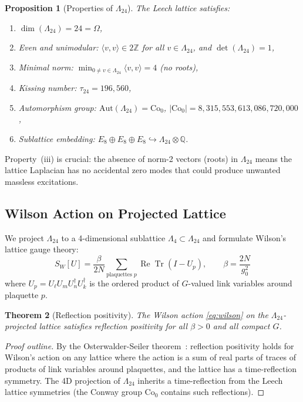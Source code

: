 \documentclass[11pt,a4paper]{article}
\theoremstyle{plain}
\newtheorem{theorem}{Theorem}[section]
\newtheorem{proposition}[theorem]{Proposition}
\theoremstyle{remark}
\renewcommand{\Omega}{\varOmega}
\newcommand{\Z}{\mathbb{Z}}
\newcommand{\Q}{\mathbb{Q}}
\newcommand{\abs}[1]{\lvert #1 \rvert}
\newcommand{\Tr}{\operatorname{Tr}}
\begin{document}
\begin{proposition}[Properties of $\Lambda_{24}$]
\label{prop:leech}
The Leech lattice satisfies:
\begin{enumerate}[label=(\roman*)]
\item $\dim(\Lambda_{24}) = 24 = \Omega$,
\item Even and unimodular: $\langle v, v \rangle \in 2\Z$ for all
  $v \in \Lambda_{24}$, and $\det(\Lambda_{24}) = 1$,
\item Minimal norm: $\min_{0 \neq v \in \Lambda_{24}} \langle v, v \rangle = 4$
  (no roots),
\item Kissing number: $\tau_{24} = 196{,}560$,
\item Automorphism group: $\mathrm{Aut}(\Lambda_{24}) = \mathrm{Co}_0$,
  $\abs{\mathrm{Co}_0} = 8{,}315{,}553{,}613{,}086{,}720{,}000$,
\item Sublattice embedding: $E_8 \oplus E_8 \oplus E_8 \hookrightarrow
  \Lambda_{24} \otimes \Q$.
\end{enumerate}
\end{proposition}

Property~(iii) is crucial: the absence of norm-2 vectors (roots) in
$\Lambda_{24}$ means the lattice Laplacian has no accidental zero modes
that could produce unwanted massless excitations.

\subsection{Wilson Action on Projected Lattice}

We project $\Lambda_{24}$ to a 4-dimensional sublattice
$\Lambda_4 \subset \Lambda_{24}$ and formulate Wilson's lattice gauge
theory:
\begin{equation}\label{eq:wilson}
  S_W[U] = \frac{\beta}{2N} \sum_{\text{plaquettes } p}
  \operatorname{Re}\Tr(I - U_p), \qquad \beta = \frac{2N}{g_0^2}
\end{equation}
where $U_p = U_\ell U_m U_n^\dagger U_k^\dagger$ is the ordered product
of $G$-valued link variables around plaquette $p$.

\begin{theorem}[Reflection positivity]
\label{thm:RP}
The Wilson action \eqref{eq:wilson} on the $\Lambda_{24}$-projected lattice
satisfies reflection positivity for all $\beta > 0$ and all compact $G$.
\end{theorem}

\begin{proof}[Proof outline]
By the Osterwalder-Seiler theorem~\cite{osterwalder-seiler1978}: reflection
positivity holds for Wilson's action on any lattice where the action is a
sum of real parts of traces of products of link variables around plaquettes,
and the lattice has a time-reflection symmetry. The 4D projection of
$\Lambda_{24}$ inherits a time-reflection from the Leech lattice symmetries
(the Conway group $\mathrm{Co}_0$ contains such reflections).
\end{proof}
\end{document}
